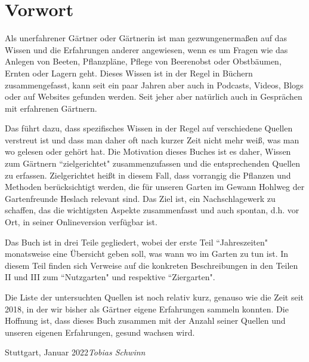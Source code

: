 \chapter{Vorwort}

Als unerfahrener Gärtner oder Gärtnerin ist man gezwungenermaßen auf das Wissen und die Erfahrungen anderer angewiesen, wenn es um Fragen wie das Anlegen von Beeten, Pflanzpläne, Pflege von Beerenobst oder Obstbäumen, Ernten oder Lagern geht.
Dieses Wissen ist in der Regel in Büchern zusammengefasst, kann seit ein paar Jahren aber auch in Podcasts, Videos, Blogs oder auf Websites gefunden werden.
Seit jeher aber natürlich auch in Gesprächen mit erfahrenen Gärtnern.

Das führt dazu, dass spezifisches Wissen in der Regel auf verschiedene Quellen verstreut ist und dass man daher oft nach kurzer Zeit nicht mehr weiß, was man wo gelesen oder gehört hat.
Die Motivation dieses Buches ist es daher, Wissen zum Gärtnern ``zielgerichtet" zusammenzufassen und die entsprechenden Quellen zu erfassen.
Zielgerichtet heißt in diesem Fall, dass vorrangig die Pflanzen und Methoden berücksichtigt werden, die für unseren Garten im Gewann Hohlweg der Gartenfreunde Heslach relevant sind.
Das Ziel ist, ein Nachschlagewerk zu schaffen, das die wichtigsten Aspekte zusammenfasst und auch spontan, d.h. vor Ort, in seiner Onlineversion verfügbar ist.

Das Buch ist in drei Teile gegliedert, wobei der erste Teil ``Jahreszeiten" monatsweise eine Übersicht geben soll, was wann wo im Garten zu tun ist.
In diesem Teil finden sich Verweise auf die konkreten Beschreibungen in den Teilen II und III zum ``Nutzgarten" und respektive ``Ziergarten".

Die Liste der untersuchten Quellen ist noch relativ kurz, genauso wie die Zeit seit 2018, in der wir bisher als Gärtner eigene Erfahrungen sammeln konnten.
Die Hoffnung ist, dass dieses Buch zusammen mit der Anzahl seiner Quellen und unseren eigenen Erfahrungen, gesund wachsen wird.

\vspace{\baselineskip}
\begin{flushright}\noindent
	Stuttgart, Januar 2022\hfill {\it Tobias  Schwinn}\\
\end{flushright}
